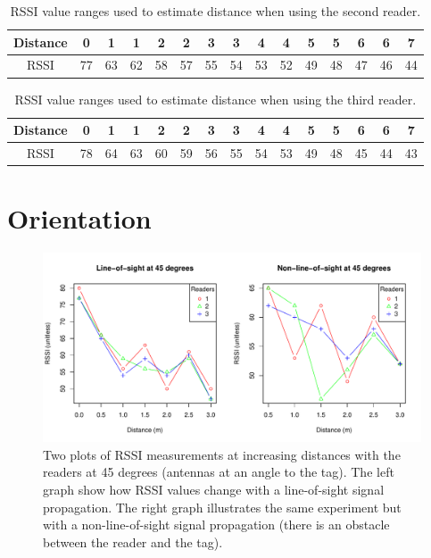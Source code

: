 \begin{table}[h]
	\centering
	\begin{tabular}{ | c | c | c || c | c || c | c || c | c || c | c || c | c || c | c | }
		\hline
		Distance 	& 0  & 1  & 1  & 2  & 2  & 3  & 3  & 4  & 4  & 5  & 5  & 6  & 6  & 7  \\ \hline
		RSSI 		& 77 & 63 & 62 & 58 & 57 & 55 & 54 &53  & 52 & 49 & 48 & 47 & 46 & 44 \\ \hline
	\end{tabular}
	\caption{RSSI value ranges used to estimate distance when using the second reader. }
	\label{tbl:trans2}
\end{table}

\begin{table}[h]
	\centering
	\begin{tabular}{ | c | c | c || c | c || c | c || c | c || c | c || c | c || c | c | }
		\hline
		Distance 	& 0  & 1  & 1  & 2  & 2  & 3  & 3  & 4  & 4  & 5  & 5  & 6  & 6  & 7  \\ \hline
		RSSI 		& 78 & 64 & 63 & 60 & 59 & 56 & 55 & 54 & 53 & 49 & 48 & 45 & 44 & 43 \\ \hline
	\end{tabular}
	\caption{RSSI value ranges used to estimate distance when using the third reader. }
	\label{tbl:trans3}
\end{table}

\newpage
\section{Orientation}

\begin{figure}[H]
	\begin{center}
		\includegraphics[width=1\textwidth]{figures/rssi_distance_3m_45deg}
		\caption{Two plots of RSSI measurements at increasing distances with the readers at 45 degrees (antennas at an angle to the tag). The left graph show how RSSI values change with a line-of-sight signal propagation. The right graph illustrates the same experiment but with a non-line-of-sight signal propagation (there is an obstacle between the reader and the tag).}
	\end{center}
\end{figure}

